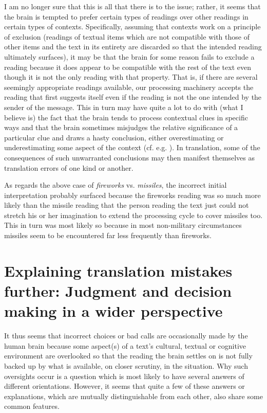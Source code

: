 \documentclass[output=paper]{LSP/langsci}
\begin{document}
  I am no longer sure that this is all that there is to the issue; rather, it seems that the brain is tempted to prefer certain types of readings over other readings in certain types of contexts. Specifically, assuming that contexts work on a principle of exclusion (readings of textual items which are not compatible with those of other items and the text in its entirety are discarded so that the intended reading ultimately surfaces), it may be that the brain for some reason fails to exclude a reading because it does appear to be compatible with the rest of the text even though it is not the only reading with that property. That is, if there are several seemingly appropriate readings available, our processing machinery accepts the reading that first suggests itself even if the reading is not the one intended by the sender of the message. This in turn may have quite a lot to do with (what I believe is) the fact that the brain tends to process contextual clues in specific ways and that the brain sometimes misjudges the relative significance of a particular clue and draws a hasty conclusion, either overestimating or underestimating some aspect of the context (cf. e.g. \citealt[169--193]{Dascal2003}). In translation, some of the consequences of such unwarranted conclusions may then manifest themselves as translation errors of one kind or another.

  As regards the above case of \textit{fireworks} vs. \textit{missiles}, the incorrect initial interpretation probably surfaced because the fireworks reading was so much more likely than the missile reading that the person reading the text just could not stretch his or her imagination to extend the processing cycle to cover missiles too. This in turn was most likely so because in most non-military circumstances missiles seem to be encountered far less frequently than fireworks.

\section{Explaining translation mistakes further: Judgment and decision making in a wider perspective}\label{hietaranta:sec:4}
\largerpage
It thus seems that incorrect choices or bad calls are occasionally made by the human brain because some aspect(s) of a text's cultural, textual or cognitive environment are overlooked so that the reading the brain settles on is not fully backed up by what is available, on closer scrutiny, in the situation. Why such oversights occur is a question which is most likely to have several answers of different orientations. However, it seems that quite a few of these answers or explanations, which are mutually distinguishable from each other, also share some common features.
\end{document}
